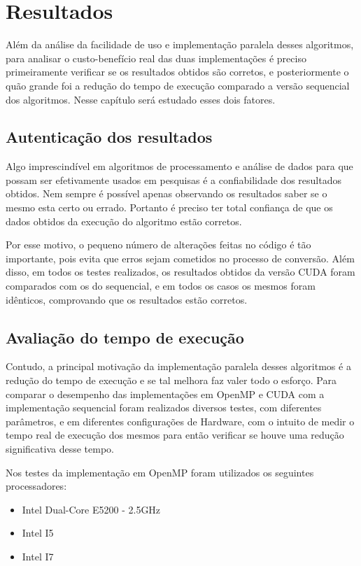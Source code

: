 \chapter{Resultados}

Além da análise da facilidade de uso e implementação paralela desses algoritmos, para analisar o custo-benefício real das duas implementações é preciso primeiramente verificar se os resultados obtidos são corretos, e posteriormente o quão grande foi a redução do tempo de execução comparado a versão sequencial dos algoritmos. Nesse capítulo será estudado esses dois fatores.

\section{Autenticação dos resultados}

Algo imprescindível em algoritmos de processamento e análise de dados para que possam ser efetivamente usados em pesquisas é a confiabilidade dos resultados obtidos. Nem sempre é possível apenas observando os resultados saber se o mesmo esta certo ou errado. Portanto é preciso ter total confiança de que os dados obtidos da execução do algoritmo estão corretos.

Por esse motivo, o pequeno número de alterações feitas no código é tão importante, pois evita que erros sejam cometidos no processo de conversão. Além disso, em todos os testes realizados, os resultados obtidos da versão CUDA foram comparados com os do sequencial, e em todos os casos os mesmos foram idênticos, comprovando que os resultados estão corretos.

\section{Avaliação do tempo de execução}

Contudo, a principal motivação da implementação paralela desses algoritmos é a redução do tempo de execução e se tal melhora faz valer todo o esforço. Para comparar o desempenho das implementações em OpenMP e CUDA com a implementação sequencial foram realizados diversos testes, com diferentes parâmetros, e em diferentes configurações de Hardware, com o intuito de medir o tempo real de execução dos mesmos para então verificar se houve uma redução significativa desse tempo.

Nos testes da implementação em OpenMP foram utilizados os seguintes processadores:

\begin{itemize}
\item Intel Dual-Core E5200 - 2.5GHz
\item Intel I5
\item Intel I7
\end{itemize}

